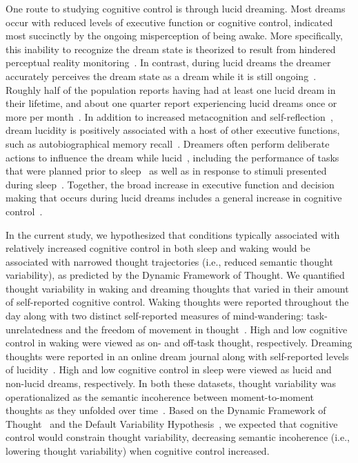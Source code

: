 \documentclass[10pt,a4paper,twocolumn]{article}
\begin{document}
\par
One route to studying cognitive control is through lucid dreaming. Most dreams occur with reduced levels of executive function or cognitive control, indicated most succinctly by the ongoing misperception of being awake. More specifically, this inability to recognize the dream state is theorized to result from hindered perceptual reality monitoring~\cite{dijkstra2022}. In contrast, during lucid dreams the dreamer accurately perceives the dream state as a dream while it is still ongoing~\cite{baird2019,tononi2024}. Roughly half of the population reports having had at least one lucid dream in their lifetime, and about one quarter report experiencing lucid dreams once or more per month~\cite{saunders2016}. In addition to increased metacognition and self-reflection~\cite{laberge2018,voss2013}, dream lucidity is positively associated with a host of other executive functions, such as autobiographical memory recall~\cite{laberge2018,voss2013}. Dreamers often perform deliberate actions to influence the dream while lucid~\cite{mota-rolim2013,stumbrys2014}, including the performance of tasks that were planned prior to sleep~\cite{dresler2011,sandell2024} as well as in response to stimuli presented during sleep~\cite{konkoly2021,turker2023}. Together, the broad increase in executive function and decision making that occurs during lucid dreams includes a general increase in cognitive control~\cite{tononi2024}. 

\par
In the current study, we hypothesized that conditions typically associated with relatively increased cognitive control in both sleep and waking would be associated with narrowed thought trajectories (i.e., reduced semantic thought variability), as predicted by the Dynamic Framework of Thought. We quantified thought variability in waking and dreaming thoughts that varied in their amount of self-reported cognitive control. Waking thoughts were reported throughout the day along with two distinct self-reported measures of mind-wandering: task-unrelatedness and the freedom of movement in thought~\cite{mills2021,mills2018a}. High and low cognitive control in waking were viewed as on- and off-task thought, respectively. Dreaming thoughts were reported in an online dream journal along with self-reported levels of lucidity~\cite{schredl2022}. High and low cognitive control in sleep were viewed as lucid and non-lucid dreams, respectively. In both these datasets, thought variability was operationalized as the semantic incoherence between moment-to-moment thoughts as they unfolded over time~\cite{bedi2015,corcoran2020,elvevag2007}. Based on the Dynamic Framework of Thought~\cite{christoff2016} and the Default Variability Hypothesis~\cite{mills2018}, we expected that cognitive control would constrain thought variability, decreasing semantic incoherence (i.e., lowering thought variability) when cognitive control increased.
\end{document}
